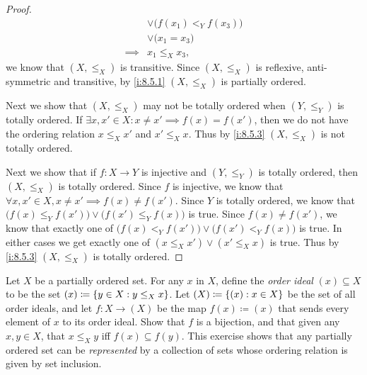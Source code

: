 \begin{proof}
\begin{align*}
             & \lor \big(f(x_1) <_Y f(x_3)\big)                                                                                                    \\
             & \lor \big(x_1 = x_3\big)                                                                                                            \\
    \implies & x_1 \leq_X x_3,
  \end{align*}
  we know that \((X, \leq_X)\) is transitive.
  Since \((X, \leq_X)\) is reflexive, anti-symmetric and transitive, by \cref{i:8.5.1} \((X, \leq_X)\) is partially ordered.

  Next we show that \((X, \leq_X)\) may not be totally ordered when \((Y, \leq_Y)\) is totally ordered.
  If \(\exists x, x' \in X : x \neq x' \implies f(x) = f(x')\), then we do not have the ordering relation \(x \leq_X x'\) and \(x' \leq_X x\).
  Thus by \cref{i:8.5.3} \((X, \leq_X)\) is not totally ordered.

  Next we show that if \(f : X \to Y\) is injective and \((Y, \leq_Y)\) is totally ordered, then \((X, \leq_X)\) is totally ordered.
  Since \(f\) is injective, we know that \(\forall x, x' \in X, x \neq x' \implies f(x) \neq f(x')\).
  Since \(Y\) is totally ordered, we know that \(\big(f(x) \leq_Y f(x')\big) \lor \big(f(x') \leq_Y f(x)\big)\) is true.
  Since \(f(x) \neq f(x')\), we know that exactly one of \(\big(f(x) <_Y f(x')\big) \lor \big(f(x') <_Y f(x)\big)\) is true.
  In either cases we get exactly one of \((x \leq_X x') \lor (x' \leq_X x)\) is true.
  Thus by \cref{i:8.5.3} \((X, \leq_X)\) is totally ordered.
\end{proof}

\begin{ex}\label{i:ex:8.5.6}
  Let \(X\) be a partially ordered set.
  For any \(x\) in \(X\), define the \emph{order ideal} \((x) \subseteq X\) to be the set \((x) \coloneqq \left\lbrace y \in X : y \leq_X x\right\rbrace\).
  Let \((X) \coloneqq \left\lbrace(x) : x \in X\right\rbrace\) be the set of all order ideals, and let \(f : X \to (X)\) be the map \(f(x) \coloneqq (x)\) that sends every element of \(x\) to its order ideal.
  Show that \(f\) is a bijection, and that given any \(x, y \in X\), that \(x \leq_X y\) iff \(f(x) \subseteq f(y)\).
  This exercise shows that any partially ordered set can be \emph{represented} by a collection of sets whose ordering relation is given by set inclusion.
\end{ex}

